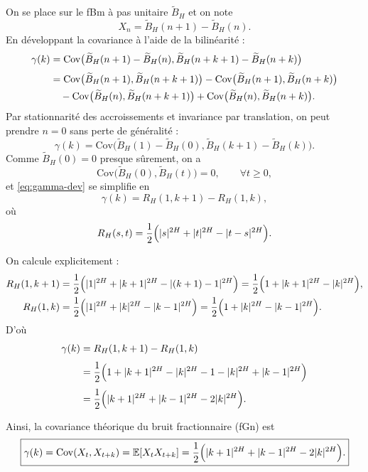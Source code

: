 \documentclass[11pt,a4paper]{article}
\newcommand{\E}{\mathbb{E}}
\newcommand{\Cov}{\mathrm{Cov}}
\newcommand{\1}{\mathbf{1}}
\begin{document}
On se place sur le fBm à pas unitaire $\widetilde B_H$ et on note
\begin{equation}
  X_n = \widetilde B_H(n+1)-\widetilde B_H(n).
\end{equation}
En développant la covariance à l'aide de la bilinéarité :
\begin{align}
  \gamma(k)
  &= \Cov\bigl(\widetilde B_H(n+1)-\widetilde B_H(n),
               \widetilde B_H(n+k+1)-\widetilde B_H(n+k)\bigr)
  \\[0.3em]
  &= \Cov\bigl(\widetilde B_H(n+1),\widetilde B_H(n+k+1)\bigr)
   - \Cov\bigl(\widetilde B_H(n+1),\widetilde B_H(n+k)\bigr)
  \notag\\
  &\quad
   - \Cov\bigl(\widetilde B_H(n),\widetilde B_H(n+k+1)\bigr)
   + \Cov\bigl(\widetilde B_H(n),\widetilde B_H(n+k)\bigr).
  \label{eq:gamma-dev}
\end{align}
Par stationnarité des accroissements et invariance par translation,
on peut prendre $n=0$ sans perte de généralité :
\begin{equation}
  \gamma(k)
  = \Cov\bigl(\widetilde B_H(1)-\widetilde B_H(0),
               \widetilde B_H(k+1)-\widetilde B_H(k)\bigr).
\end{equation}
Comme $\widetilde B_H(0)=0$ presque sûrement, on a
\[
  \Cov\bigl(\widetilde B_H(0),\widetilde B_H(t)\bigr)=0,\qquad \forall t\ge 0,
\]
et \eqref{eq:gamma-dev} se simplifie en
\begin{equation}
  \gamma(k)
  = R_H(1,k+1) - R_H(1,k),
\end{equation}
où
\[
  R_H(s,t)
  = \frac{1}{2}\Bigl(|s|^{2H} + |t|^{2H} - |t-s|^{2H}\Bigr).
\]

On calcule explicitement :
\begin{align}
  R_H(1,k+1)
  &= \frac{1}{2}\Bigl(|1|^{2H} + |k+1|^{2H} - |(k+1)-1|^{2H}\Bigr)
   = \frac{1}{2}\Bigl(1 + |k+1|^{2H} - |k|^{2H}\Bigr),
\\
  R_H(1,k)
  &= \frac{1}{2}\Bigl(|1|^{2H} + |k|^{2H} - |k-1|^{2H}\Bigr)
   = \frac{1}{2}\Bigl(1 + |k|^{2H} - |k-1|^{2H}\Bigr).
\end{align}
D'où
\begin{align}
  \gamma(k)
  &= R_H(1,k+1) - R_H(1,k)
\\[0.3em]
  &= \frac{1}{2}\Bigl(1 + |k+1|^{2H} - |k|^{2H}
                      - 1 - |k|^{2H} + |k-1|^{2H}\Bigr)
\\[0.3em]
  &= \frac{1}{2}\Bigl(|k+1|^{2H} + |k-1|^{2H} - 2|k|^{2H}\Bigr).
\end{align}

Ainsi, la covariance théorique du bruit fractionnaire (fGn) est
\begin{equation}
  \boxed{
  \gamma(k)
  = \Cov(X_t,X_{t+k})
  = \E[X_t X_{t+k}]
  = \frac{1}{2}\Bigl(|k+1|^{2H} + |k-1|^{2H} - 2|k|^{2H}\Bigr).
  }
\end{equation}
\end{document}
